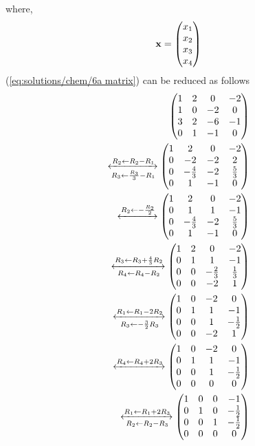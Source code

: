 where,
\begin{align}
   \mathbf{x}= \begin{pmatrix} x_{1}\\x_{2}\\x_{3}\\x_{4}\end{pmatrix}
\end{align}
%
(\ref{eq:solutions/chem/6a matrix}) can be reduced as follows
\begin{align}
    \begin{pmatrix} 1 & 2 & 0 & -2\\
           1 & 0 & -2 & 0\\
           3 & 2 & -6 & -1\\
           0 & 1 & -1 & 0\end{pmatrix}
	   \\
    \xleftrightarrow[R_{3}\leftarrow \frac{R_3}{3}-R_{1}]{R_{2}\leftarrow R_2- R_1}
    \begin{pmatrix} 1 & 2 & 0 & -2\\
           0 & -2 & -2 & 2\\
           0 & -\frac{4}{3} & -2 & \frac{5}{3}\\
           0 & 1 & -1 & 0\end{pmatrix}\\
    \xleftrightarrow{R_2 \leftarrow -\frac{R_2}{2}}
    \begin{pmatrix} 1 & 2 & 0 & -2\\
          0 & 1 & 1 & -1\\
          0 & -\frac{4}{3} & -2 & \frac{5}{3}\\
          0 & 1 & -1 & 0\end{pmatrix}\\
    \xleftrightarrow[R_4 \leftarrow R_4- R_2]{R_3 \leftarrow R_3 + \frac{4}{3}R_2}
    \begin{pmatrix} 1 & 2 & 0 & -2\\
           0 & 1 & 1 & -1\\
           0 & 0 & -\frac{2}{3} & \frac{1}{3}\\
           0 & 0 & -2 & 1\end{pmatrix}\\
    \xleftrightarrow[R_3 \leftarrow -\frac{3}{2}R_3]{R_1 \leftarrow R_1- 2R_2}
    \begin{pmatrix} 1 & 0 & -2 & 0\\
           0 & 1 & 1 & -1\\
           0 & 0 & 1 & -\frac{1}{2}\\
           0 & 0 & -2 & 1\end{pmatrix}\\
    \xleftrightarrow{R_4\leftarrow R_4 + 2R_3}
    \begin{pmatrix} 1 & 0 & -2 & 0\\
           0 & 1 & 1 & -1\\
           0 & 0 & 1 & -\frac{1}{2}\\
           0 & 0 & 0 & 0\end{pmatrix}\\
    \xleftrightarrow[R_2\leftarrow R_2-R_3]{R_1\leftarrow R_1 + 2R_3}
    \begin{pmatrix} 1 & 0 & 0 & -1\\
           0 & 1 & 0 & -\frac{1}{2}\\
           0 & 0 & 1 & -\frac{1}{2}\\
           0 & 0 & 0 & 0\end{pmatrix}
\end{align}

